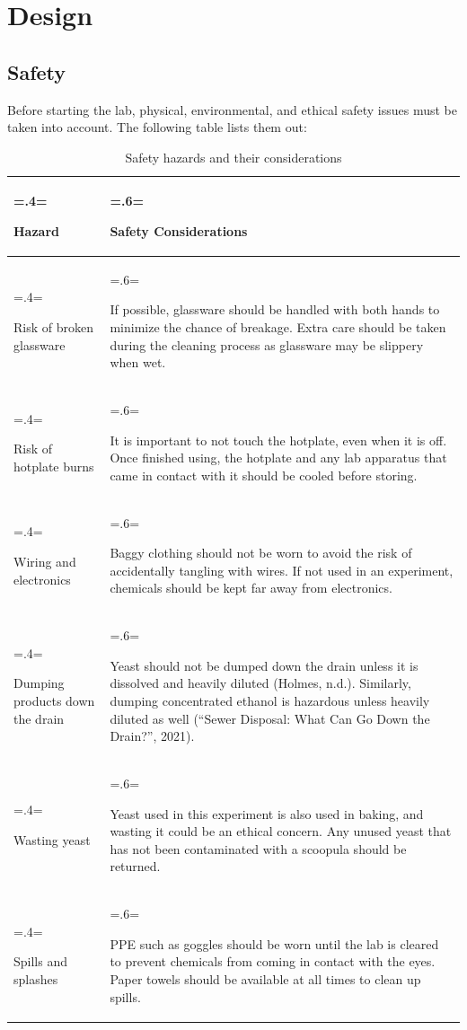 \documentclass{article}
\begin{document}
\newpage

\section{Design}

\subsection{Safety}
Before starting the lab, physical, environmental, and ethical safety issues must be taken into account. The following table lists them out:
\begin{table}[H]
\centering
\caption{Safety hazards and their considerations}
\label{table:1}
\begin{tabularx}{\textwidth} {
    | >{\hsize=.4\hsize \linewidth=\hsize \raggedright\arraybackslash}X
    | >{\hsize=.6\hsize \linewidth=\hsize \raggedright\arraybackslash}X |
}
    \hline
    \textbf{Hazard} & \textbf{Safety Considerations} \\
    \hline
    Risk of broken glassware & If possible, glassware should be handled with both hands to minimize the chance of breakage. Extra care should be taken during the cleaning process as glassware may be slippery when wet.\\
    \hline
    Risk of hotplate burns & It is important to not touch the hotplate, even when it is off. Once finished using, the hotplate and any lab apparatus that came in contact with it should be cooled before storing.\\
    \hline
    Wiring and electronics & Baggy clothing should not be worn to avoid the risk of accidentally tangling with wires. If not used in an experiment, chemicals should be kept far away from electronics.\\
    \hline
    Dumping products down the drain & Yeast should not be dumped down the drain unless it is dissolved and heavily diluted (Holmes, n.d.). Similarly, dumping concentrated ethanol is hazardous unless heavily diluted as well (“Sewer Disposal: What Can Go Down the Drain?”, 2021). \\
    \hline
    Wasting yeast & Yeast used in this experiment is also used in baking, and wasting it could be an ethical concern. Any unused yeast that has not been contaminated with a scoopula should be returned.\\
    \hline
    Spills and splashes & PPE such as goggles should be worn until the lab is cleared to prevent chemicals from coming in contact with the eyes. Paper towels should be available at all times to clean up spills.\\
    \hline
\end{tabularx}
\end{table}
\end{document}
